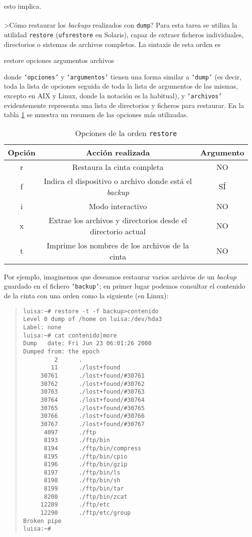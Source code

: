 esto implica.\\
\\>C\'omo restaurar los {\it backups} realizados con {\tt dump}? Para esta
tarea se utiliza la utilidad {\tt restore} ({\tt ufsrestore} en Solaris), capaz
de extraer ficheros individuales, directorios o sistemas de archivos completos.
La sintaxis de esta orden es 
\tt
\begin{center}
restore opciones argumentos archivos
\end{center}
\rm
donde {\tt `opciones'} y {\tt `argumentos'} tienen una forma similar a
{\tt `dump'} (es decir, toda la lista de opciones seguida de toda la lista de
argumentos de las mismas, excepto en AIX y Linux, donde la notaci\'on es la
habitual), y {\tt `archivos'} evidentemente representa una
lista de directorios y ficheros para restaurar. En la tabla \ref{restoreops}
se muestra un resumen de las opciones m\'as utilizadas.
\begin{table}
\begin{center}
\begin{tabular}{|c|c|c|}
\hline
Opci\'on & Acci\'on realizada & Argumento\\
\hline\hline
r & Restaura la cinta completa & NO\\
\hline
f & Indica el dispositivo o archivo donde est\'a el {\it backup} & S\'I\\
\hline
i & Modo interactivo & NO\\
\hline
x & Extrae los archivos y directorios desde el directorio actual & NO\\
\hline
t & Imprime los nombres de los archivos de la cinta & NO\\
\hline
\end{tabular}
\caption{Opciones de la orden {\tt restore}}
\label{restoreops}
\end{center}
\end{table}
Por ejemplo, imaginemos que deseamos restaurar varios archivos de un {\it 
backup} guardado en el fichero {\tt `backup'}; en primer lugar podemos consultar
el contenido de la cinta con una orden como la siguiente (en Linux):
\begin{quote}
\begin{verbatim}
luisa:~# restore -t -f backup>contenido
Level 0 dump of /home on luisa:/dev/hda3
Label: none
luisa:~# cat contenido|more
Dump   date: Fri Jun 23 06:01:26 2000
Dumped from: the epoch
         2      .
        11      ./lost+found
     30761      ./lost+found/#30761
     30762      ./lost+found/#30762
     30763      ./lost+found/#30763
     30764      ./lost+found/#30764
     30765      ./lost+found/#30765
     30766      ./lost+found/#30766
     30767      ./lost+found/#30767
      4097      ./ftp
      8193      ./ftp/bin
      8194      ./ftp/bin/compress
      8195      ./ftp/bin/cpio
      8196      ./ftp/bin/gzip
      8197      ./ftp/bin/ls
      8198      ./ftp/bin/sh
      8199      ./ftp/bin/tar
      8200      ./ftp/bin/zcat
     12289      ./ftp/etc
     12290      ./ftp/etc/group
Broken pipe
luisa:~#
\end{verbatim}
\end{quote}
